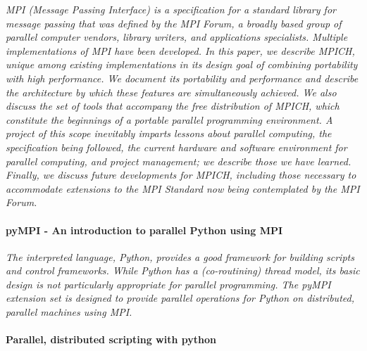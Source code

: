 \documentclass{article}
\begin{document}
\emph{MPI (Message Passing Interface) is a specification for a standard library
for message passing that was defined by the MPI Forum, a broadly based group of
parallel computer vendors, library writers, and applications specialists.
Multiple implementations of MPI have been developed. In this paper, we describe
MPICH, unique among existing implementations in its design goal of combining
portability with high performance. We document its portability and performance
and describe the architecture by which these features are simultaneously
achieved. We also discuss the set of tools that accompany the free distribution
of MPICH, which constitute the beginnings of a portable parallel programming
environment. A project of this scope inevitably imparts lessons about parallel
computing, the specification being followed, the current hardware and software
environment for parallel computing, and project management; we describe those
we have learned.  Finally, we discuss future developments for MPICH, including
those necessary to accommodate extensions to the MPI Standard now being
contemplated by the MPI Forum.}

\paragraph{pyMPI - An introduction to parallel Python using MPI}
\cite{miller2002pympi}

\emph{The interpreted language, Python, provides a good framework for building
scripts and control frameworks. While Python has a (co-routining) thread model,
its basic design is not particularly appropriate for parallel programming. The
pyMPI extension set is designed to provide parallel operations for Python on
distributed, parallel machines using MPI.}

\paragraph{Parallel, distributed scripting with python} \cite{millerparallel}
\end{document}
